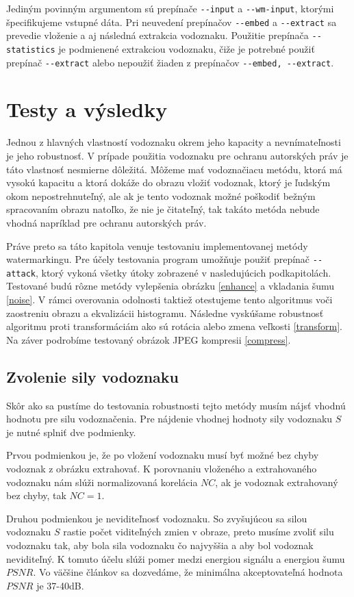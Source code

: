 Jediným povinným argumentom sú prepínače \verb|--input| a \verb|--wm-input|, ktorými špecifikujeme vstupné dáta. Pri neuvedení prepínačov \verb|--embed| a \verb|--extract| sa prevedie vloženie a aj následná extrakcia vodoznaku. Použitie prepínača \verb|--statistics| je podmienené extrakciou vodoznaku, čiže je potrebné použiť prepínač \verb|--extract| alebo nepoužiť žiaden z prepínačov \verb|--embed, --extract|.


\chapter{Testy a výsledky} \label{testy}
Jednou z hlavných vlastností vodoznaku okrem jeho kapacity a nevnímateľnosti je jeho robustnosť. V prípade použitia vodoznaku pre ochranu autorských práv je táto vlastnosť nesmierne dôležitá. Môžeme mať vodoznačiacu metódu, ktorá má vysokú kapacitu a ktorá dokáže do obrazu vložiť vodoznak, ktorý je ľudským okom nepostrehnuteľný, ale ak je tento vodoznak možné poškodiť bežným spracovaním obrazu natoľko, že nie je čitateľný, tak takáto metóda nebude vhodná napríklad pre ochranu autorských práv.

Práve preto sa táto kapitola venuje testovaniu implementovanej metódy watermarkingu. Pre účely testovania program umožňuje použiť prepínač \verb|--attack|, ktorý vykoná všetky útoky zobrazené v nasledujúcich podkapitolách.
Testované budú rôzne metódy vylepšenia obrázku \ref{enhance} a vkladania šumu \ref{noise}. V rámci overovania odolnosti taktiež otestujeme tento algoritmus voči zaostreniu obrazu a ekvalizácii histogramu. Následne vyskúšame robustnosť algoritmu proti transformáciám ako sú rotácia alebo zmena veľkosti \ref{transform}. Na záver podrobíme testovaný obrázok JPEG kompresii \ref{compress}.

\section{Zvolenie sily vodoznaku}
Skôr ako sa pustíme do testovania robustnosti tejto metódy musím nájsť vhodnú hodnotu pre silu vodoznačenia. Pre nájdenie vhodnej hodnoty sily vodoznaku $S$ je nutné splniť dve podmienky.

Prvou podmienkou je, že po vložení vodoznaku musí byť možné bez chyby vodoznak z obrázku extrahovať. K porovnaniu vloženého a extrahovaného vodoznaku nám slúži normalizovaná korelácia $NC$, ak je vodoznak extrahovaný bez chyby, tak $NC = 1$.

Druhou podmienkou je neviditeľnosť vodoznaku. So zvyšujúcou sa silou vodoznaku $S$ rastie počet viditeľných zmien v obraze, preto musíme zvoliť silu vodoznaku tak, aby bola sila vodoznaku čo najvyššia a aby bol vodoznak neviditeľný. K tomuto účelu slúži pomer medzi energiou signálu a energiou šumu $PSNR$. Vo väčšine článkov sa dozvedáme, že minimálna akceptovateľná hodnota $PSNR$ je 37-40dB.

